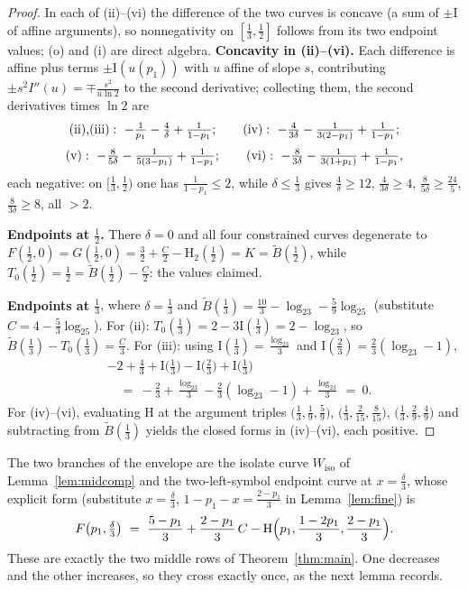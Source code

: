 \documentclass[journal]{IEEEtran}
\theoremstyle{definition}
\newcommand{\Hh}{\mathrm H_2}
\newcommand{\lgg}{\log_2}
\newcommand{\CC}{C}
\begin{document}
\begin{proof}
In each of (ii)--(vi) the difference of the two curves is concave (a sum of
$\pm\mathrm I$ of affine arguments), so nonnegativity on $[\tfrac13,\tfrac12]$
follows from its two endpoint values; (o) and (i) are direct algebra.
\textbf{Concavity in
(ii)--(vi).} Each difference is affine plus terms $\pm \mathrm I(u(p_1))$ with $u$
affine of slope $s$, contributing $\pm s^2I''(u)=\mp\tfrac{s^2}{u\ln2}$ to
the second derivative; collecting them, the second derivatives times $\ln2$
are
\[
  \textup{(ii),(iii)}:\ -\tfrac1{p_1}-\tfrac4\delta+\tfrac1{1-p_1};\qquad
  \textup{(iv)}:\ -\tfrac4{3\delta}-\tfrac1{3(2-p_1)}+\tfrac1{1-p_1};
\]
\[
  \textup{(v)}:\ -\tfrac8{5\delta}-\tfrac1{5(3-p_1)}+\tfrac1{1-p_1};\qquad
  \textup{(vi)}:\ -\tfrac8{3\delta}-\tfrac1{3(1+p_1)}+\tfrac1{1-p_1},
\]
each negative: on $[\tfrac13,\tfrac12)$ one has $\tfrac1{1-p_1}\le2$, while
$\delta\le\tfrac13$ gives $\tfrac4\delta\ge12$, $\tfrac4{3\delta}\ge4$,
$\tfrac8{5\delta}\ge\tfrac{24}5$, $\tfrac8{3\delta}\ge8$, all $>2$.

\textbf{Endpoints at $\tfrac12$.} There $\delta=0$ and all four constrained
curves degenerate to
$F(\tfrac12,0)=G(\tfrac12,0)=\tfrac32+\tfrac{\CC}2-\Hh(\tfrac12)=K
=\tilde B(\tfrac12)$, while $T_0(\tfrac12)=\tfrac12=\tilde B(\tfrac12)
-\tfrac{\CC}2$: the values claimed.

\textbf{Endpoints at $\tfrac13$}, where $\delta=\tfrac13$ and
$\tilde B(\tfrac13)=\tfrac{10}3-\lgg3-\tfrac59\lgg5$ (substitute
$\CC=4-\tfrac53\lgg5$). For (ii):
$T_0(\tfrac13)=2-3\mathrm I(\tfrac13)=2-\lgg3$, so $\tilde
B(\tfrac13)-T_0(\tfrac13)=\tfrac{\CC}3$. For (iii): using
$\mathrm I(\tfrac13)=\tfrac{\lgg3}3$ and $\mathrm I(\tfrac23)=\tfrac23(\lgg3-1)$,
\[
\begin{aligned}
  &-2+\tfrac43+\mathrm I\bigl(\tfrac13\bigr)-\mathrm I\bigl(\tfrac23\bigr)
  +\mathrm I\bigl(\tfrac13\bigr)\\
  &\quad=\ -\tfrac23+\tfrac{\lgg3}3-\tfrac23(\lgg3-1)+\tfrac{\lgg3}3\ =\ 0 .
\end{aligned}
\]
For (iv)--(vi), evaluating $\mathrm H$ at the argument triples
$\bigl(\tfrac13,\tfrac19,\tfrac59\bigr)$,
$\bigl(\tfrac13,\tfrac2{15},\tfrac8{15}\bigr)$,
$\bigl(\tfrac13,\tfrac29,\tfrac49\bigr)$ and subtracting from
$\tilde B(\tfrac13)$ yields the closed forms in (iv)--(vi), each positive.
\end{proof}

The two branches of the envelope are the isolate curve $W_{\mathrm{iso}}$ of
Lemma~\ref{lem:midcomp} and the two-left-symbol endpoint curve at
$x=\tfrac\delta3$, whose explicit form (substitute $x=\tfrac\delta3$,
$1-p_1-x=\tfrac{2-p_1}3$ in Lemma~\ref{lem:fine}) is
\[
  F\bigl(p_1,\tfrac\delta3\bigr)
  \ =\ \frac{5-p_1}{3}+\frac{2-p_1}{3}\,\CC
  -\mathrm H\Bigl(p_1,\frac{1-2p_1}{3},\frac{2-p_1}{3}\Bigr).
\]
These are exactly the two middle rows of Theorem~\ref{thm:main}. One decreases and
the other increases, so they cross exactly once, as the next lemma records.
\end{document}
